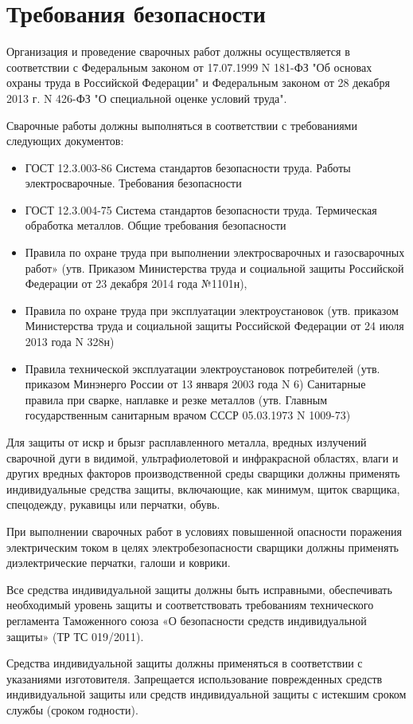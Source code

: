 \documentclass[russian,utf8,pointsection,nocolumnxxxi,nocolumnxxxii,12pt]{eskdtext}
\begin{document}
\section{Требования безопасности}

Организация и проведение сварочных работ должны осуществляется в соответствии с Федеральным законом от 17.07.1999 N 181-ФЗ "Об основах охраны труда в Российской Федерации" и Федеральным законом от 28 декабря 2013 г. N 426-ФЗ "О специальной оценке условий труда". \par
Сварочные работы должны выполняться в соответствии с требованиями следующих документов:
\begin{itemize}
\item ГОСТ 12.3.003-86 Система стандартов безопасности труда. Работы электросварочные. Требования безопасности
\item ГОСТ 12.3.004-75 Система стандартов безопасности труда. Термическая обработка металлов. Общие требования безопасности

\item Правила по охране труда при выполнении электросварочных и газосварочных работ» (утв. Приказом Министерства труда и социальной защиты Российской Федерации от 23 декабря 2014 года №1101н), 
\item Правила по охране труда при эксплуатации электроустановок (утв. приказом Министерства труда и социальной защиты Российской Федерации от 24 июля 2013 года N 328н) 
\item Правила технической эксплуатации электроустановок потребителей (утв. приказом Минэнерго России от 13 января 2003 года N 6)
Санитарные правила при сварке, наплавке и резке металлов (утв. Главным государственным санитарным врачом СССР 05.03.1973 N 1009-73)
\end{itemize}
\par
Для защиты от искр и брызг расплавленного металла, вредных излучений сварочной дуги в видимой, ультрафиолетовой и инфракрасной областях, влаги и других вредных факторов производственной среды сварщики должны применять индивидуальные средства защиты, включающие, как минимум, щиток сварщика, спецодежду, рукавицы или перчатки, обувь.
\par
При выполнении сварочных работ в условиях повышенной опасности поражения электрическим током в целях электробезопасности сварщики должны применять диэлектрические перчатки, галоши и коврики.
\par
Все средства индивидуальной защиты должны быть исправными, обеспечивать необходимый уровень защиты и соответствовать требованиям технического регламента Таможенного союза «О безопасности средств индивидуальной защиты» (ТР ТС 019/2011).
\par
Средства индивидуальной защиты должны применяться в соответствии с указаниями изготовителя.
Запрещается использование поврежденных средств индивидуальной защиты или средств индивидуальной защиты с истекшим сроком службы (сроком годности).
\end{document}

